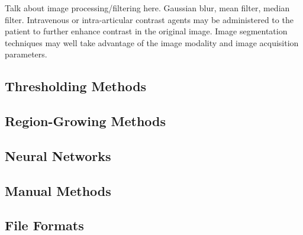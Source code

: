 Talk about image processing/filtering here. Gaussian blur, mean filter, median filter.
Intravenous or intra-articular contrast agents may be administered to the patient to further enhance contrast in the original image. Image segmentation techniques may well take advantage of the image modality and image acquisition parameters. 

\subsection{Thresholding Methods}
\label{Thresholding Methods}

\subsection{Region-Growing Methods}
\label{Region-Growing Methods}

\subsection{Neural Networks}
\label{Neural Networks}

\subsection{Manual Methods}
\label{Manual Methods}

\subsection{File Formats}
\label{Data Format-SEG}

